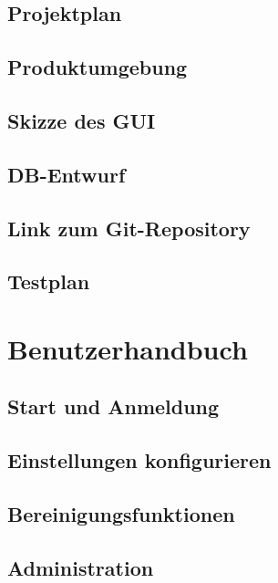 \documentclass[12pt,a4paper]{article}
\begin{document}
\subsection{Projektplan}

\subsection{Produktumgebung}

\subsection{Skizze des GUI}

\subsection{DB-Entwurf}

\subsection{Link zum Git-Repository}

\subsection{Testplan}


\section{Benutzerhandbuch}
\subsection{Start und Anmeldung}


\subsection{Einstellungen konfigurieren}



\subsection{Bereinigungsfunktionen}



\subsection{Administration}

\end{document}
